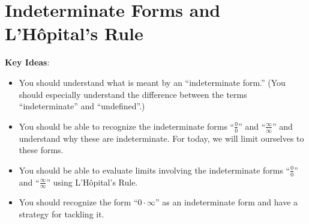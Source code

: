 \documentclass[main]{subfiles}
\begin{document}
\ifSubfilesClassLoaded{%
  \chaptermark{\chapterfour}
}{}

\section{Indeterminate Forms and L'Hôpital's Rule} \label{ws4-1}

\begin{problemonly}
    \begin{framed}

\textbf{Key Ideas}:

\begin{itemize}[topsep=0pt,partopsep=0pt,parsep=8pt,itemsep=0pt]

    \item You should understand what is meant by an ``indeterminate form.''
      (You should especially understand the difference between the terms
      ``indeterminate'' and ``undefined''.)
    
    \item You should be able to recognize the indeterminate forms
      ``$\frac{0}{0}$'' and ``$\frac{\infty}{\infty}$'' and understand
      why these are indeterminate. For today, we will limit ourselves
      to these forms.
    
    \item You should be able to evaluate limits involving the indeterminate
      forms ``$\frac{0}{0}$'' and ``$\frac{\infty}{\infty}$'' using L'Hôpital's
      Rule.


    \item You should recognize the form ``$0\cdot\infty$'' as an indeterminate
  form and have a strategy for tackling it. 

\end{itemize}
\end{framed}
\end{problemonly}
\end{document}
